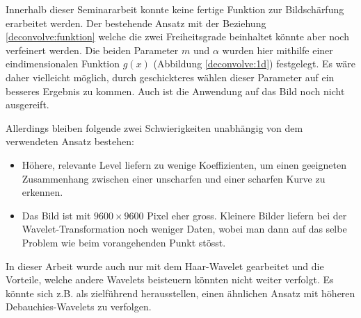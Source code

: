 Innerhalb dieser Seminararbeit konnte keine fertige Funktion zur Bildschärfung erarbeitet werden.
Der bestehende Ansatz mit der Beziehung \eqref{deconvolve:funktion} welche die zwei Freiheitsgrade beinhaltet könnte aber noch verfeinert werden.
Die beiden Parameter $m$ und $\alpha$ wurden hier mithilfe einer eindimensionalen Funktion $g(x)$ (Abbildung \ref{deconvolve:1d}) festgelegt.
Es wäre daher vielleicht möglich, durch geschickteres wählen dieser Parameter auf ein besseres Ergebnis zu kommen.
Auch ist die Anwendung auf das Bild noch nicht ausgereift.

Allerdings bleiben folgende zwei Schwierigkeiten unabhängig von dem verwendeten Ansatz bestehen:
\begin{itemize}
	\item Höhere, relevante Level liefern zu wenige Koeffizienten, um einen geeigneten Zusammenhang zwischen einer unscharfen und einer scharfen Kurve zu erkennen.
	\item Das Bild ist mit $9600\times9600$ Pixel eher gross. Kleinere Bilder liefern bei der Wavelet-Transformation noch weniger Daten, wobei man dann auf das selbe Problem wie beim vorangehenden Punkt stösst.
\end{itemize}

In dieser Arbeit wurde auch nur mit dem Haar-Wavelet gearbeitet und die Vorteile, welche andere Wavelets beisteuern könnten nicht weiter verfolgt.
Es könnte sich z.B. als zielführend herausstellen, einen ähnlichen Ansatz mit höheren Debauchies-Wavelets zu verfolgen.


